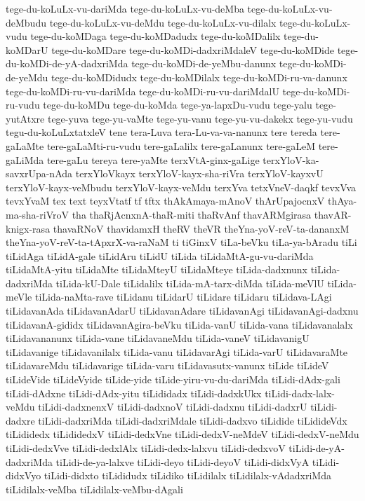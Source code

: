 {tege-du-koLuLx-vu-dariMda
tege-du-koLuLx-vu-deMba
tege-du-koLuLx-vu-deMbudu
tege-du-koLuLx-vu-deMdu
tege-du-koLuLx-vu-dilalx
tege-du-koLuLx-vudu
tege-du-koMDaga
tege-du-koMDadudx
tege-du-koMDalilx
tege-du-koMDarU
tege-du-koMDare
tege-du-koMDi-dadxriMdaleV
tege-du-koMDide
tege-du-koMDi-de-yA-dadxriMda
tege-du-koMDi-de-yeMbu-danunx
tege-du-koMDi-de-yeMdu
tege-du-koMDidudx
tege-du-koMDilalx
tege-du-koMDi-ru-va-danunx
tege-du-koMDi-ru-vu-dariMda
tege-du-koMDi-ru-vu-dariMdalU
tege-du-koMDi-ru-vudu
tege-du-koMDu
tege-du-koMda
tege-ya-lapxDu-vudu
tege-yalu
tege-yutAtxre
tege-yuva
tege-yu-vaMte
tege-yu-vanu
tege-yu-vu-dakekx
tege-yu-vudu
tegu-du-koLuLxtatxleV
tene
tera-Luva
tera-Lu-va-va-nanunx
tere
tereda
tere-gaLaMte
tere-gaLaMti-ru-vudu
tere-gaLalilx
tere-gaLanunx
tere-gaLeM
tere-gaLiMda
tere-gaLu
tereya
tere-yaMte
terxVtA-ginx-gaLige
terxYloV-ka-savxrUpa-nAda
terxYloVkayx
terxYloV-kayx-sha-riVra
terxYloV-kayxvU
terxYloV-kayx-veMbudu
terxYloV-kayx-veMdu
terxYva
tetxVneV-daqkf
tevxVva
tevxYvaM
tex
text
teyxVtatf
tf
tftx
thAkAmaya-mAnoV
thArUpajocnxV
thAya-ma-sha-riVroV
tha
thaRjAcnxnA-thaR-miti
thaRvAnf
thavARMgirasa
thavAR-knigx-rasa
thavaRNoV
thavidamxH
theRV
theVR
theYna-yoV-reV-ta-dananxM
theYna-yoV-reV-ta-tApxrX-va-raNaM
ti
tiGinxV
tiLa-beVku
tiLa-ya-bAradu
tiLi
tiLidAga
tiLidA-gale
tiLidAru
tiLidU
tiLida
tiLidaMtA-gu-vu-dariMda
tiLidaMtA-yitu
tiLidaMte
tiLidaMteyU
tiLidaMteye
tiLida-dadxnunx
tiLida-dadxriMda
tiLida-kU-Dale
tiLidalilx
tiLida-mA-tarx-diMda
tiLida-meVlU
tiLida-meVle
tiLida-naMta-rave
tiLidanu
tiLidarU
tiLidare
tiLidaru
tiLidava-LAgi
tiLidavanAda
tiLidavanAdarU
tiLidavanAdare
tiLidavanAgi
tiLidavanAgi-dadxnu
tiLidavanA-gididx
tiLidavanAgira-beVku
tiLida-vanU
tiLida-vana
tiLidavanalalx
tiLidavananunx
tiLida-vane
tiLidavaneMdu
tiLida-vaneV
tiLidavanigU
tiLidavanige
tiLidavanilalx
tiLida-vanu
tiLidavarAgi
tiLida-varU
tiLidavaraMte
tiLidavareMdu
tiLidavarige
tiLida-varu
tiLidavasutx-vanunx
tiLide
tiLideV
tiLideVide
tiLideVyide
tiLide-yide
tiLide-yiru-vu-du-dariMda
tiLidi-dAdx-gali
tiLidi-dAdxne
tiLidi-dAdx-yitu
tiLididadx
tiLidi-dadxkUkx
tiLidi-dadx-lalx-veMdu
tiLidi-dadxnenxV
tiLidi-dadxnoV
tiLidi-dadxnu
tiLidi-dadxrU
tiLidi-dadxre
tiLidi-dadxriMda
tiLidi-dadxriMdale
tiLidi-dadxvo
tiLidide
tiLidideVdx
tiLididedx
tiLididedxV
tiLidi-dedxVne
tiLidi-dedxV-neMdeV
tiLidi-dedxV-neMdu
tiLidi-dedxVve
tiLidi-dedxlAlx
tiLidi-dedx-lalxvu
tiLidi-dedxvoV
tiLidi-de-yA-dadxriMda
tiLidi-de-ya-lalxve
tiLidi-deyo
tiLidi-deyoV
tiLidi-didxVyA
tiLidi-didxVyo
tiLidi-didxto
tiLididudx
tiLidiko
tiLidilalx
tiLidilalx-vAdadxriMda
tiLidilalx-veMba
tiLidilalx-veMbu-dAgali
}
